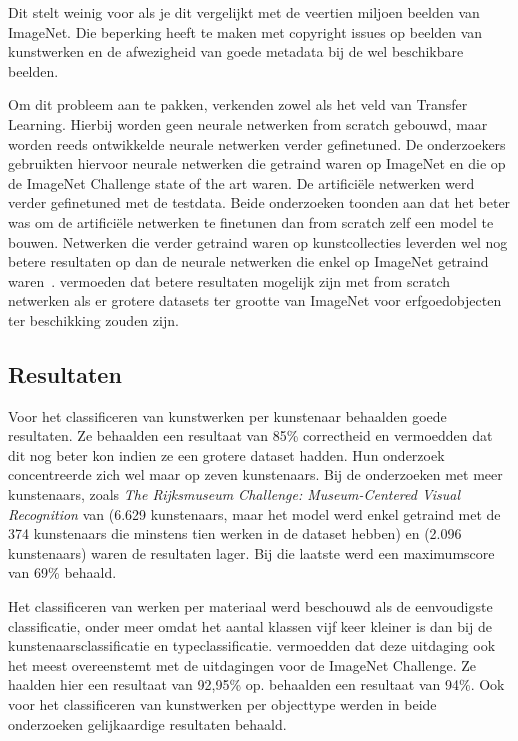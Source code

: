 Dit stelt weinig voor als je dit vergelijkt met de veertien miljoen beelden van ImageNet. Die beperking heeft te maken met copyright issues op beelden van kunstwerken en de afwezigheid van goede metadata bij de wel beschikbare beelden. 

Om dit probleem aan te pakken, verkenden zowel \textcite{Sabatteli2018} als \textcite{Elgammal2018} het veld van Transfer Learning. Hierbij worden geen neurale netwerken from scratch gebouwd, maar worden reeds ontwikkelde neurale netwerken verder gefinetuned. De onderzoekers gebruikten hiervoor neurale netwerken die getraind waren op ImageNet en die op de ImageNet Challenge state of the art waren. De artifici\"{e}le netwerken werd verder gefinetuned met de testdata. Beide onderzoeken toonden aan dat het beter was om de artificiële netwerken te finetunen dan from scratch zelf een model te bouwen. Netwerken die verder getraind waren op kunstcollecties leverden wel nog betere resultaten op dan de neurale netwerken die enkel op ImageNet getraind waren~\autocite{Sabatteli2018}. \textcite{Elgammal2018} vermoeden dat betere resultaten mogelijk zijn met from scratch netwerken als er grotere datasets ter grootte van ImageNet voor erfgoedobjecten ter beschikking zouden zijn.

\subsection{Resultaten}
\label{subsec:cv-voor-ce-resultaten}

Voor het classificeren van kunstwerken per kunstenaar behaalden \textcite{Blessings2013} goede resultaten. Ze behaalden een resultaat van 85\% correctheid en vermoedden dat dit nog beter kon indien ze een grotere dataset hadden. Hun onderzoek concentreerde zich wel maar op zeven kunstenaars. Bij de onderzoeken met meer kunstenaars, zoals \textit{The Rijksmuseum Challenge: Museum-Centered Visual Recognition} van \textcite{Mensink2014} (6.629 kunstenaars, maar het model werd enkel getraind met de 374 kunstenaars die minstens tien werken in de dataset hebben) en \textcite{Sabatteli2018} (2.096 kunstenaars) waren de resultaten lager. Bij die laatste werd een maximumscore van 69\% behaald.

Het classificeren van werken per materiaal werd beschouwd als de eenvoudigste classificatie, onder meer omdat het aantal klassen vijf keer kleiner is dan bij de kunstenaarsclassificatie en typeclassificatie. \textcite{Sabatteli2018} vermoedden dat deze uitdaging ook het meest overeenstemt met de uitdagingen voor de ImageNet Challenge. Ze haalden hier een resultaat van 92,95\% op. \textcite{Mensink2014} behaalden een resultaat van 94\%. Ook voor het classificeren van kunstwerken per objecttype werden in beide onderzoeken gelijkaardige resultaten behaald.

